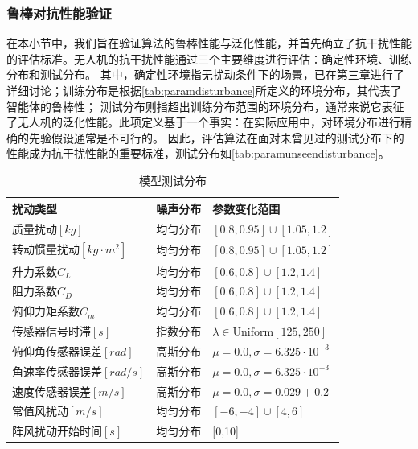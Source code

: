 \subsubsection{鲁棒对抗性能验证}
在本小节中，我们旨在验证算法的鲁棒性能与泛化性能，并首先确立了抗干扰性能的评估标准。无人机的抗干扰性能通过三个主要维度进行评估：确定性环境、训练分布和测试分布。
其中，确定性环境指无扰动条件下的场景，已在第三章进行了详细讨论；训练分布是根据\autoref{tab:paramdisturbance}所定义的环境分布，其代表了智能体的鲁棒性；
测试分布则指超出训练分布范围的环境分布，通常来说它表征了无人机的泛化性能。此项定义基于一个事实：在实际应用中，对环境分布进行精确的先验假设通常是不可行的。
因此，评估算法在面对未曾见过的测试分布下的性能成为抗干扰性能的重要标准，测试分布如\autoref{tab:paramunseendisturbance}。
\begin{table}
    \centering
    \caption{模型测试分布}
    \label{tab:paramunseendisturbance}
    \begin{tabular*}{0.8\textwidth}{@{\extracolsep{\fill}}lll}
        \toprule
        扰动类型 & 噪声分布 & 参数变化范围 \\
        \midrule
        质量扰动\( \left [ kg \right ]  \) & 均匀分布 &  \( [0.8,0.95]\cup[1.05,1.2] \)\\
        转动惯量扰动\( \left [ kg \cdot m^{2} \right ]  \) & 均匀分布 & \(  [0.8,0.95]\cup[1.05,1.2]  \) \\
        升力系数\(C_{L}\) & 均匀分布 & \( [0.6,0.8]\cup[1.2,1.4]  \) \\
        阻力系数\(C_{D}\) & 均匀分布 & \( [0.6,0.8]\cup[1.2,1.4]  \) \\
        俯仰力矩系数\(C_{m} \) & 均匀分布 & \( [0.6,0.8]\cup[1.2,1.4]  \) \\
        传感器信号时滞\( \left [ s \right ]  \) & 指数分布 & \(\lambda\in  \text{Uniform}[ 125,250] \) \\
        俯仰角传感器误差\( \left [ rad \right ]  \) & 高斯分布 & \(\mu = 0.0 ,\sigma =  6.325 \cdot 10^{-3}\) \\
        角速率传感器误差\( \left [ rad/s \right ]  \) & 高斯分布 & \( \mu = 0.0 ,\sigma = 6.325 \cdot 10^{-3}\) \\
        速度传感器误差\( \left [ m/s \right ]  \) & 高斯分布 & \( \mu = 0.0 ,\sigma = 0.029 + 0.2 \) \\
        常值风扰动\( \left [ m/s \right ]  \) & 均匀分布 & \( [-6,-4]\cup[4,6] \)  \\
        阵风扰动开始时间\( \left [ s \right ]\) &均匀分布 & [0,10]\\
        \bottomrule
    \end{tabular*}
\end{table}

